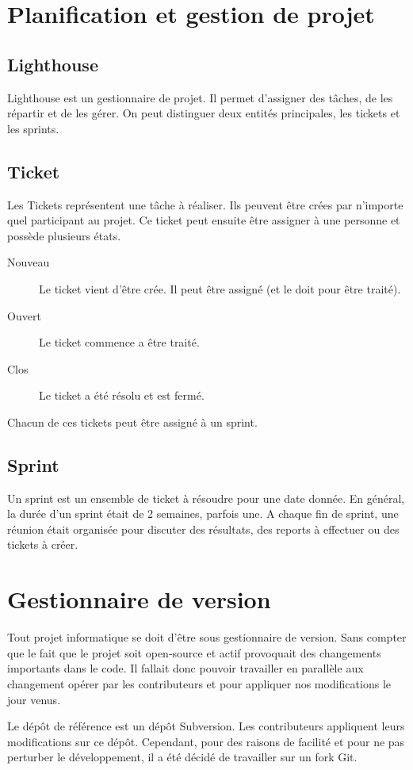 \section{Planification et gestion de projet}
\subsection{Lighthouse}
Lighthouse est un gestionnaire de projet. Il permet d'assigner des tâches, de les répartir et de les gérer. On peut distinguer deux entités principales, les tickets et les sprints.
\subsection{Ticket}
Les Tickets représentent une tâche à réaliser. Ils peuvent être crées par n'importe quel participant au projet. Ce ticket peut ensuite être assigner à une personne et possède plusieurs états.
\begin{description}
\item[Nouveau] Le ticket vient d'être crée. Il peut être assigné (et le doit pour être traité).
\item[Ouvert] Le ticket commence a être traité.
\item[Clos] Le ticket a été résolu et est fermé.
\end{description}
Chacun de ces tickets peut être assigné à un sprint.
\subsection{Sprint}
Un sprint est un ensemble de ticket à résoudre pour une date donnée. En général, la durée d'un sprint était de 2 semaines, parfois une. A chaque fin de sprint, une réunion était organisée pour discuter des résultats, des reports à effectuer ou des tickets à créer.
\section{Gestionnaire de version}
Tout projet informatique se doit d'être sous gestionnaire de version. Sans compter que le fait que le projet soit open-source et actif provoquait des changements importants dans le code. Il fallait donc pouvoir travailler en parallèle aux changement opérer par les contributeurs et pour appliquer nos modifications le jour venus.

Le dépôt de référence est un dépôt Subversion. Les contributeurs appliquent leurs modifications sur ce dépôt. Cependant, pour des raisons de facilité et pour ne pas perturber le développement, il a été décidé de travailler sur un fork Git.

